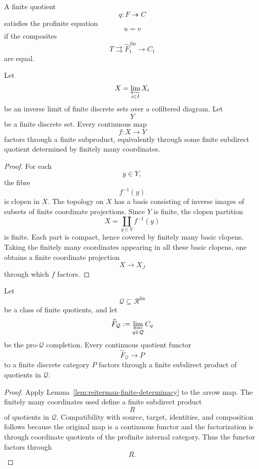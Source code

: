 \begin{definition}
\label{def:reiterman-profinite-satisfaction}
A finite quotient
\[
q:F\twoheadrightarrow C
\]
satisfies the profinite equation
\[
u=v
\]
if the composites
\[
T\rightrightarrows
\widehat F^{\,\mathrm{fin}}_1
\to
C_1
\]
are equal.
\end{definition}

\begin{lemma}
\label{lem:reiterman-finite-determinacy}
Let
\[
X=\varprojlim_{i\in I}X_i
\]
be an inverse limit of finite discrete sets over a cofiltered diagram. Let
\[
Y
\]
be a finite discrete set. Every continuous map
\[
f:X\to Y
\]
factors through a finite subproduct, equivalently through some finite
subdirect quotient determined by finitely many coordinates.
\end{lemma}

\begin{proof}
For each
\[
y\in Y,
\]
the fibre
\[
f^{-1}(y)
\]
is clopen in \(X\). The topology on \(X\) has a basis consisting of inverse
images of subsets of finite coordinate projections. Since \(Y\) is finite,
the clopen partition
\[
X=\coprod_{y\in Y}f^{-1}(y)
\]
is finite. Each part is compact, hence covered by finitely many basic
clopens. Taking the finitely many coordinates appearing in all these basic
clopens, one obtains a finite coordinate projection
\[
X\to X_J
\]
through which \(f\) factors.
\end{proof}

\begin{proposition}
\label{prop:reiterman-finite-maps-factor-subdirect}
Let
\[
\mathcal Q\subseteq\mathcal R^{\mathrm{fin}}
\]
be a class of finite quotients, and let
\[
\widehat F_{\mathcal Q}
:=
\varprojlim_{q\in\mathcal Q}C_q
\]
be the pro-\(\mathcal Q\) completion. Every continuous quotient functor
\[
\widehat F_{\mathcal Q}\to P
\]
to a finite discrete category \(P\) factors through a finite subdirect
product of quotients in \(\mathcal Q\).
\end{proposition}

\begin{proof}
Apply Lemma~\ref{lem:reiterman-finite-determinacy} to the arrow map. The
finitely many coordinates used define a finite subdirect product
\[
R
\]
of quotients in \(\mathcal Q\). Compatibility with source, target, identities,
and composition follows because the original map is a continuous functor and
the factorization is through coordinate quotients of the profinite internal
category. Thus the functor factors through
\[
R.
\]
\end{proof}

